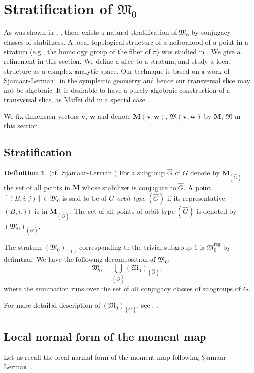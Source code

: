 \documentclass[12pt]{amsart}
\def\frak{\mathfrak}
\theoremstyle{definition}
\newtheorem{Definition}[equation]{Definition}
\theoremstyle{remark}
\numberwithin{equation}{subsection}
\newcommand{\bM}{{\mathbf M}} %
\newcommand{\M}{{\frak M}} %
\newcommand{\Mreg}{{\frak M_0^{\operatorname{reg}}}}
\newcommand{\bv}{{\mathbf v}} %
\newcommand{\bw}{{\mathbf w}} %
\begin{document}
\section{Stratification of $\M_0$}\label{sec:strat}

As was shown in \cite[\S6]{Na-quiver}, \cite[3.v]{Na-alg}, there
exists a natural stratification of $\M_0$ by conjugacy classes of
stabilizers.
%
A local topological structure of a neiborhood of a point in a stratum
(e.g., the homology group of the fiber of $\pi$) was studied in
\cite[6.10]{Na-quiver}. We give a refinement in this section. We
define a slice to a stratum, and study a local structure as a complex
analytic space.
%
Our technique is based on a work of Sjamaar-Lerman~\cite{SL} in the
symplectic geometry and hence our transversal slice may not be
algebraic. It is desirable to have a purely algebraic construction of
a transversal slice, as Maffei did in a special case~\cite{Maf}.

We fix dimension vectors $\bv$, $\bw$ and denote
$\bM(\bv,\bw)$, $\M(\bv,\bw)$ by $\bM$, $\M$ in this section.

\subsection{Stratification}
\begin{Definition}\label{def:strat}(cf.\ Sjamaar-Lerman \cite{SL})
For a subgroup $\widehat G$ of $G$ denote by
$\bM_{(\widehat G)}$ the set 
of all points in $\bM$ whose stabilizer is conjugate to $\widehat G$.
A point $[(B,i,j)]\in\M_0$ is said to be of {\it $G$-orbit type\/}
$(\widehat G)$ if its representative $(B,i,j)$ is in
$\bM_{(\widehat G)}$.
The set of all points of orbit type $(\widehat G)$ is denoted by
$(\M_0)_{(\widehat G)}$.
\end{Definition}

The stratum $(\M_0)_{(1)}$ corresponding to the trivial subgroup
$1$ is $\Mreg$ by definition.
%
We have the following decomposition of $\M_0$:
\[
        \M_0 = \bigcup_{(\widehat G)} (\M_0)_{(\widehat G)},
\]
where the summation runs over the set of all conjugacy classes of
subgroups of $G$.

For more detailed description of $(\M_0)_{(\widehat G)}$, see
\cite[6.5]{Na-quiver}, \cite[3.27]{Na-alg}.

\subsection{Local normal form of the moment map}
Let us recall the local normal form of the moment map following
Sjamaar-Lerman~\cite{SL}.
\end{document}
